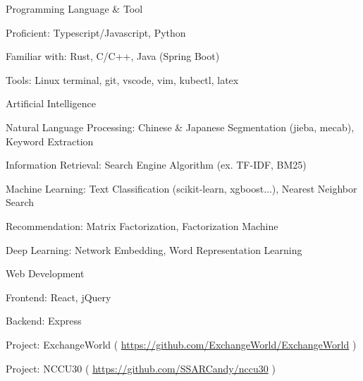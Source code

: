 

\begin{cventries}

	\cventry
	{}
	{Programming Language \& Tool}
	{}
	{}
	{
		\begin{cvitems}
			\item {Proficient: Typescript/Javascript, Python}
			\item {Familiar with: Rust, C/C++, Java (Spring Boot)}
			\item {Tools: Linux terminal, git, vscode, vim, kubectl, latex}
		\end{cvitems}
	}

	\cventry
	{} %
	{Artificial Intelligence} %
	{} %
	{} %
	{
		\begin{cvitems} %
			\item {Natural Language Processing: Chinese \& Japanese Segmentation (jieba, mecab), Keyword Extraction}
			\item {Information Retrieval: Search Engine Algorithm (ex. TF-IDF, BM25)}
			\item {Machine Learning: Text Classification (scikit-learn, xgboost...), Nearest Neighbor Search}
			\item {Recommendation: Matrix Factorization, Factorization Machine}
			\item {Deep Learning: Network Embedding, Word Representation Learning}
		\end{cvitems}
	}

	\cventry
	{} %
	{Web Development} %
	{} %
	{} %
	{
		\begin{cvitems} %
			\item {Frontend: React, jQuery}
			\item {Backend: Express}
			\item {Project: ExchangeWorld ( \url{https://github.com/ExchangeWorld/ExchangeWorld} )}
			\item {Project: NCCU30 ( \url{https://github.com/SSARCandy/nccu30} )}
		\end{cvitems}
	}


\end{cventries}
